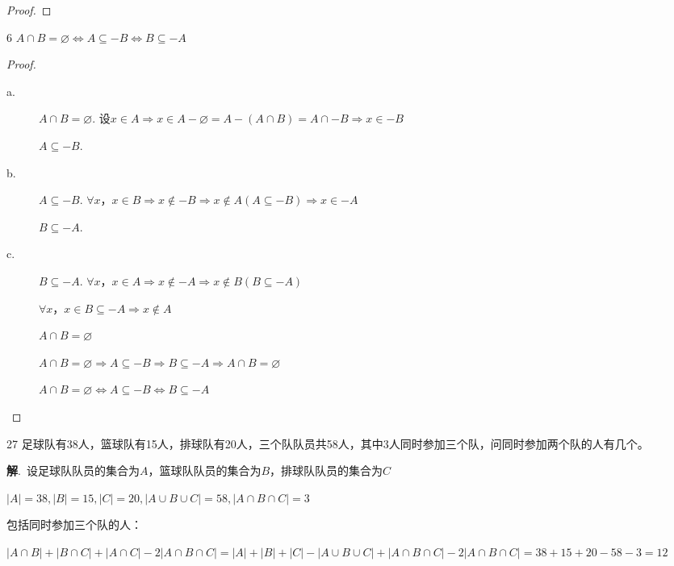 \documentclass[12pt]{article}
\newenvironment{firstlayer}%
{\begin{list}{}{\renewcommand{\makelabel}[1]{\textbf{##1}.\hfil}
}}
{\end{list}}
\newenvironment{secondlayer}%
{\begin{list}{}{\renewcommand{\makelabel}[1]{(##1)\hfil}
}}
{\end{list}}
\providecommand{\sol}{\textbf{解}.~}
\begin{document}
\begin{CJK}{UTF8}{gbsn}
\begin{firstlayer}
\begin{secondlayer}
\begin{proof}
\end{proof}

\item[6] $A\cap B=\varnothing \Leftrightarrow A\subseteq -B\Leftrightarrow B\subseteq -A$

\begin{proof}

  \begin{description}
  \item[a.]  $A\cap B=\varnothing$. 设$x\in A\Rightarrow x\in A-\varnothing=A-(A\cap B)=A\cap-B\Rightarrow x\in -B$

$A\subseteq -B$.
  \item[b.] $A\subseteq -B$. $\forall x$，$x\in B\Rightarrow x\notin -B\Rightarrow x\notin A(A\subseteq -B)\Rightarrow x\in -A$

$B\subseteq -A$.
  \item[c.] $B\subseteq -A$. $\forall x$，$x\in A\Rightarrow x\notin -A \Rightarrow x\notin B(B\subseteq -A)$

$\forall x$，$x\in B\subseteq -A\Rightarrow x\notin A$

$A\cap B=\varnothing$

$A\cap B=\varnothing \Rightarrow A\subseteq -B\Rightarrow B\subseteq -A \Rightarrow A\cap B=\varnothing $

$A\cap B=\varnothing \Leftrightarrow A\subseteq -B\Leftrightarrow B\subseteq -A$

\end{description}

\end{proof}


\end{secondlayer}

\item[27] 足球队有38人，篮球队有15人，排球队有20人，三个队队员共58人，其中3人同时参加三个队，问同时参加两个队的人有几个。

\sol 设足球队队员的集合为$A$，篮球队队员的集合为$B$，排球队队员的集合为$C$

$|A|=38,|B|=15,|C|=20,|A\cup B\cup C|=58,|A\cap B\cap C|=3$

包括同时参加三个队的人：

$|A\cap B|+|B\cap C|+|A\cap C|-2|A\cap B\cap C|=|A|+|B|+|C|-|A\cup B\cup C|+|A\cap B\cap C|-2|A\cap B\cap C|=38+15+20-58-3=12$

\end{firstlayer}

\end{CJK}
\end{document}
